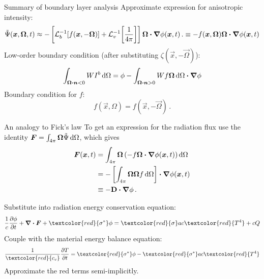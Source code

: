 \documentclass{beamer}
\begin{document}
\begin{frame}{Summary of boundary layer analysis}
  Approximate expression for anisotropic intensity:
  \begin{equation}\label{eq:capPsiApprox}
    \tilde\Psi(\bm{x}, \bm{\Omega}, t) \approx
    - \left[ \mathcal{L}_{b}^{-1}\!\left[ f(\bm{x}, -\bm{\Omega}) \right]
    + \mathcal{L}_{v}^{-1}\!\left[ \frac1{4\pi} \right] \right]
    \bm{\Omega}\bm{\cdot} \bm{\nabla} \phi(\bm{x},t)\,.
    \equiv -f(\bm{x}, \bm{\Omega}) \bm{\Omega}\bm{\cdot} \bm{\nabla} \phi(\bm{x},t)
  \end{equation}
  Low-order boundary condition (after substituting $\zeta(\vec{x},
  -\vec{\Omega})$):
  \begin{equation*}
  \int_{\bm{\Omega}\bm{\cdot} \bm{n} < 0} W I^b \mathop{}\!\mathrm{d}\Omega
  = \phi - \int_{\bm{\Omega}\bm{\cdot} \bm{n} > 0} W f \bm{\Omega} \mathop{}\!\mathrm{d}\Omega
  \bm{\cdot} \bm{\nabla} \phi
  \end{equation*}
  Boundary condition for $f$:
  \begin{equation*}
    f(\vec{x}, \Omega) = f(\vec{x}, -\vec{\Omega})\,.
  \end{equation*}
\end{frame}

\begin{frame}{An analogy to Fick's law}
  To get an expression for the radiation flux use the
  identity
  $\bm{F} = \int_{4\pi}\bm{\Omega} \tilde \Psi \mathop{}\!\mathrm{d} \Omega$, which gives
  \begin{align*}
    \bm{F}(\bm{x}, t)
    &= \int_{4\pi}\bm{\Omega} \left(
    -f \bm{\Omega}\bm{\cdot} \bm{\nabla} \phi(\bm{x},t) \right) \mathop{}\!\mathrm{d}\Omega
    \\
    &= - \left[ \int_{4\pi}\bm{\Omega} \bm{\Omega} f \mathop{}\!\mathrm{d}\Omega\right]
    \bm{\cdot} \bm{\nabla} \phi(\bm{x},t) 
    \\
      &\equiv -\mathbf{D} \bm{\cdot} \bm{\nabla} \phi \,.
  \end{align*}

  Substitute into radiation energy conservation equation:
\begin{equation*}
  \frac{1}{c} \pder{\phi}{t}
  + \del \vd \vec{F} + \textcolor{red}{\sigma^*} \phi
  = \textcolor{red}{\sigma} ac\textcolor{red}{T^4}
  + c Q
\end{equation*}
Couple with the material energy balance equation:
\begin{equation*}
  \frac{1}{\textcolor{red}{c_v}}\pder{T}{t} = \textcolor{red}{\sigma^*} \phi -
  \textcolor{red}{\sigma^*} ac\textcolor{red}{T^4}
\end{equation*}
Approximate the red terms semi-implicitly.
\end{frame}
\end{document}
